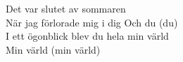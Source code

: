 \begin{lyrics}
Det var slutet av sommaren\\
När jag förlorade mig i dig
Och du (du)\\
I ett ögonblick blev du hela min värld\\
Min värld (min värld)
\end{lyrics}

